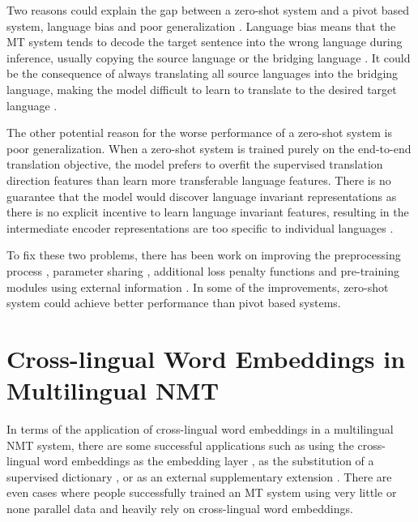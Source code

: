 \documentclass[thesis]{cluu}
\begin{document}
Two reasons could explain the gap between a zero-shot system and a pivot based system, language bias \parencite{Ha:2016aa, Ha:2017aa, Arivazhagan:2019aa} and poor generalization \parencite{Arivazhagan:2019aa}. Language bias means that the MT system tends to decode the target sentence into the wrong language during inference, usually copying the source language or the bridging language \parencite{Ha:2016aa}. It could be the consequence of always translating all source languages into the bridging language, making the model difficult to learn to translate to the desired target language \parencite{Arivazhagan:2019aa}.

The other potential reason for the worse performance of a zero-shot system is poor generalization. When a zero-shot system is trained purely on the end-to-end translation objective, the model prefers to overfit the supervised translation direction features than learn more transferable language features. There is no guarantee that the model would discover language invariant representations as there is no explicit incentive to learn language invariant features, resulting in the intermediate encoder representations are too specific to individual languages \parencite{Arivazhagan:2019aa}.

To fix these two problems, there has been work on improving the preprocessing process \parencite{Lakew:2018aa}, parameter sharing \parencite{Firat:2016aa, Blackwood:2018aa}, additional loss penalty functions \parencite{Arivazhagan:2019aa} and pre-training modules using external information \parencite{Baziotis:2020aa}. In some of the improvements, zero-shot system could achieve better performance than pivot based systems.

\section{Cross-lingual Word Embeddings in Multilingual NMT}

In terms of the application of cross-lingual word embeddings in a multilingual NMT system, there are some successful applications such as using the cross-lingual word embeddings as the embedding layer \parencite{neishi-etal-2017-bag, Artetxe:2017aa}, as the substitution of a supervised dictionary \parencite{Conneau:2017aa}, or as an external supplementary extension \parencite{inproceedings}. There are even cases where people successfully trained an MT system using very little or none parallel data \parencite{Conneau:2017aa} and heavily rely on cross-lingual word embeddings. 
\end{document}
